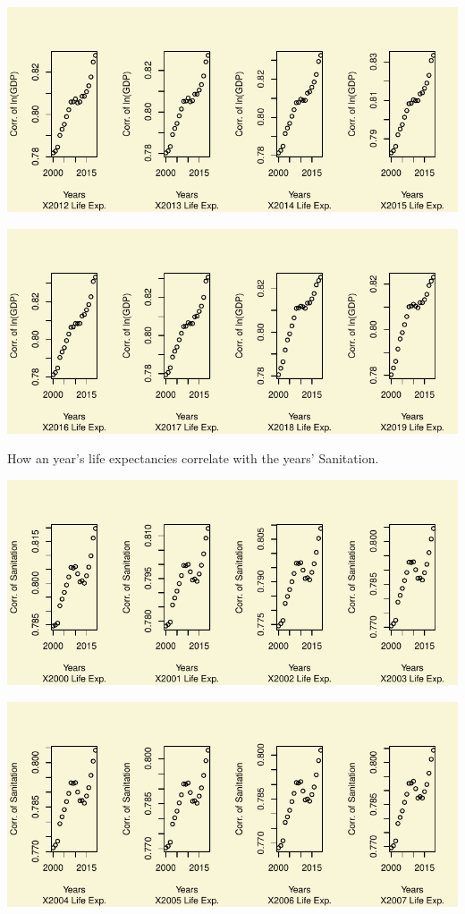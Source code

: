 \documentclass[
]{article}
\begin{document}
\includegraphics{main_files/figure-pdf/unnamed-chunk-29-4.pdf}

\includegraphics{main_files/figure-pdf/unnamed-chunk-29-5.pdf}

How an year's life expectancies correlate with the years' Sanitation.

\includegraphics{main_files/figure-pdf/unnamed-chunk-30-1.pdf}

\includegraphics{main_files/figure-pdf/unnamed-chunk-30-2.pdf}
\end{document}
